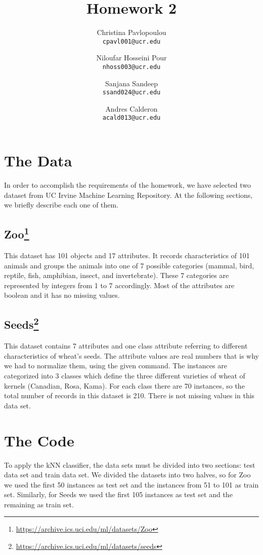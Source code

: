 \documentclass[10pt]{scrartcl}
\title{Homework 2}
\author{
   Christina Pavlopoulou\\
  \small \texttt{cpavl001@ucr.edu}
  \and
   Niloufar Hosseini Pour\\
  \small \texttt{nhoss003@ucr.edu}
  \and
   Sanjana Sandeep \\
  \small \texttt{ssand024@ucr.edu}
  \and
   Andres Calderon\\
  \small \texttt{acald013@ucr.edu}
}
\begin{document}
\tiny
\maketitle
\normalsize

\section{The Data}
In order to accomplish the requirements of the homework, we have selected two dataset from UC Irvine Machine Learning Repository\cite{repo}.  At the following sections, we briefly describe each one of them.

\subsection[Zoo]{Zoo\footnote{\url{https://archive.ics.uci.edu/ml/datasets/Zoo}}}
This dataset has 101 objects and 17 attributes. It records characteristics of 101 animals and groups the animals into one of 7 possible categories (mammal, bird, reptile, fish,
amphibian, insect, and invertebrate).  These 7 categories are represented by integers from 1 to 7 accordingly.  Most of the attributes are boolean and it has no missing values.

\subsection[Seeds]{Seeds\footnote{\url{https://archive.ics.uci.edu/ml/datasets/seeds}}}\label{sec:seeds}
This dataset contains 7 attributes and one class attribute referring to different characteristics of wheat's seeds.  The attribute values are real numbers that is why we had to normalize them, using the given command. The instances are categorized into 3 classes which define the three different varieties of wheat of kernels (Canadian, Rosa, Kama). For each class there are 70 instances, so the total number of records in this dataset is 210. There is not missing values in this data set.

\section{The Code}
To apply the kNN classifier, the data sets must be divided into two sections: test data set and train data set.  We divided the datasets into two halves, so for Zoo we used the first 50 instances as test set and the instances from 51 to 101 as train set.  Similarly, for Seeds we used the first 105 instances as test set and the remaining as train set.  
\end{document}
